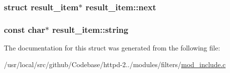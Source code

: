 \subsubsection[{\texorpdfstring{next}{next}}]{\setlength{\rightskip}{0pt plus 5cm}struct {\bf result\+\_\+item}$\ast$ result\+\_\+item\+::next}\hypertarget{structresult__item_a1ec623e42e0fc227b386f2d82d7ea7b7}{}\label{structresult__item_a1ec623e42e0fc227b386f2d82d7ea7b7}
\subsubsection[{\texorpdfstring{string}{string}}]{\setlength{\rightskip}{0pt plus 5cm}const char$\ast$ result\+\_\+item\+::string}\hypertarget{structresult__item_adbfa86ef931fc9b90e2bd16acf33fe8d}{}\label{structresult__item_adbfa86ef931fc9b90e2bd16acf33fe8d}


The documentation for this struct was generated from the following file\+:\begin{DoxyCompactItemize}
\item 
/usr/local/src/github/\+Codebase/httpd-\/2../modules/filters/\hyperlink{mod__include_8c}{mod\+\_\+include.\+c}\end{DoxyCompactItemize}
